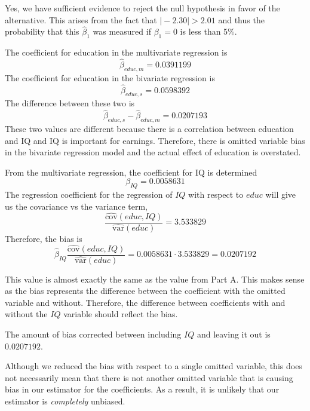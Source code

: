 \documentclass[12pt,twoside]{article}
\begin{document}
\begin{problems}
\begin{problemparts}
\problempart %

Yes, we have sufficient evidence to reject the null hypothesis in favor of
the alternative. This arises from the fact that $\vert -2.30 \vert > 2.01$
and thus the probability that this $\hat{\beta}_1$ was measured if $\beta_1
= 0$ is less than 5\%.

\end{problemparts}

\newpage

\problem  %

The coefficient for education in the multivariate regression is
$$ \hat{\beta}_{educ, m} = 0.0391199 $$
The coefficient for education in the bivariate regression is
$$ \hat{\beta}_{educ, s} = 0.0598392 $$
The difference between these two is
$$ \hat{\beta}_{educ, s} - \hat{\beta}_{educ, m} = 
\boxed{0.0207193} $$
These two values are different because there is a correlation between
education and IQ and IQ is important for earnings. Therefore, there is omitted
variable bias in the bivariate regression model and the actual effect of
education is overstated.

\problem  %

\begin{problemparts}

\problempart %

From the multivariate regression, the coefficient for IQ is determined
$$ \beta_{IQ} = 0.0058631 $$
The regression coefficient for the regression of $IQ$ with respect to $educ$ will
give us the covariance vs the variance term,
$$ \frac{\hat{\mathrm{cov}}(educ, IQ)}{\hat{\mathrm{var}}(educ)} = 3.533829 $$
Therefore, the bias is 
$$ \hat{\beta}_{IQ} \frac{\hat{\mathrm{cov}}(educ, IQ)}{\hat{\mathrm{var}}(educ)}
= 0.0058631 \cdot 3.533829 = \boxed{0.0207192} $$ 

\problempart %

This value is almost exactly the same as the value from Part A. This makes sense
as the bias represents the difference between the coefficient with the omitted
variable and without. Therefore, the difference between coefficients with and
without the $IQ$ variable should reflect the bias.

\problempart %

The amount of bias corrected between including $IQ$ and leaving it out is
$\boxed{0.0207192}$.

\end{problemparts}

\problem  %

Although we reduced the bias with respect to a single omitted variable, this does
not necessarily mean that there is not another omitted variable that is causing
bias in our estimator for the coefficients. As a result, it is unlikely that our 
estimator is \textit{completely} unbiased.

\end{problems}
\end{document}
